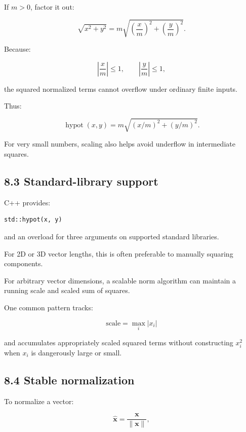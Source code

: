 If \(m>0\), factor it out:

\[ \sqrt{x^2+y^2} = m\sqrt{\left(\frac xm\right)^2+\left(\frac ym\right)^2}. \]

Because:

\[ \left|\frac xm\right|\le1, \qquad \left|\frac ym\right|\le1, \]

the squared normalized terms cannot overflow under ordinary finite inputs.

Thus:

\[ \boxed{ \operatorname{hypot}(x,y) = m\sqrt{ (x/m)^2+(y/m)^2 } }. \]

For very small numbers, scaling also helps avoid underflow in intermediate squares.

\subsection{8.3 Standard-library support}\label{02-foundations-ii-ch028-standard-library-support}

\hypertarget{02-foundations-ii-ch028-standard-library-support}{}

C++ provides:

\begin{verbatim}
std::hypot(x, y)
\end{verbatim}

and an overload for three arguments on supported standard libraries.

For 2D or 3D vector lengths, this is often preferable to manually squaring components.

For arbitrary vector dimensions, a scalable norm algorithm can maintain a running scale and scaled sum of squares.

One common pattern tracks:

\[ \text{scale}=\max_i|x_i| \]

and accumulates appropriately scaled squared terms without constructing \(x_i^2\) when \(x_i\) is dangerously large or small.

\subsection{8.4 Stable normalization}\label{02-foundations-ii-ch028-stable-normalization}

\hypertarget{02-foundations-ii-ch028-stable-normalization}{}

To normalize a vector:

\[ \hat{\mathbf x}= \frac{\mathbf x}{\|\mathbf x\|}, \]

